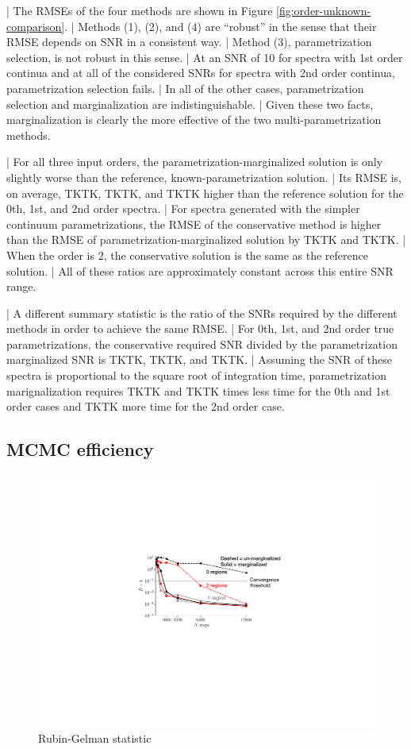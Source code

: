 \documentclass[manuscript]{aastex62}
\begin{document}
| The RMSEs of the four methods are shown in Figure \ref{fig:order-unknown-comparison}.
| Methods (1), (2), and (4) are ``robust'' in the sense that their RMSE depends on SNR in a consistent way.
| Method (3), parametrization selection, is not robust in this sense.
| At an SNR of 10 for spectra with 1st order continua and at all of the considered SNRs for spectra with 2nd order continua, parametrization selection fails.
| In all of the other cases, parametrization selection and marginalization are indistinguishable.
| Given these two facts, marginalization is clearly the more effective of the two multi-parametrization methods.

| For all three input orders, the parametrization-marginalized solution is only slightly worse than the reference, known-parametrization solution.
| Its RMSE is, on average, TKTK, TKTK, and TKTK higher than the reference solution for the 0th, 1st, and 2nd order spectra.
| For spectra generated with the simpler continuum parametrizations, the RMSE of the conservative method is higher than the RMSE of parametrization-marginalized solution by TKTK and TKTK.
| When the order is 2, the conservative solution is the same as the reference solution.
| All of these ratios are approximately constant across this entire SNR range.

| A different summary statistic is the ratio of the SNRs required by the different methods in order to achieve the same RMSE.
| For 0th, 1st, and 2nd order true parametrizations, the conservative required SNR divided by the parametrization marginalized SNR is TKTK, TKTK, and TKTK.
| Assuming the SNR of these spectra is proportional to the square root of integration time, parametrization marignalization requires TKTK and TKTK times less time for the 0th and 1st order cases and TKTK more time for the 2nd order case.

\subsection{MCMC efficiency}
\label{subsec:multiple-absorption-line-test-case}

\begin{figure}
  \includegraphics{convergence.pdf}
  \caption{Rubin-Gelman statistic}
  \label{fig:convergence-comparison}
\end{figure}
\end{document}
